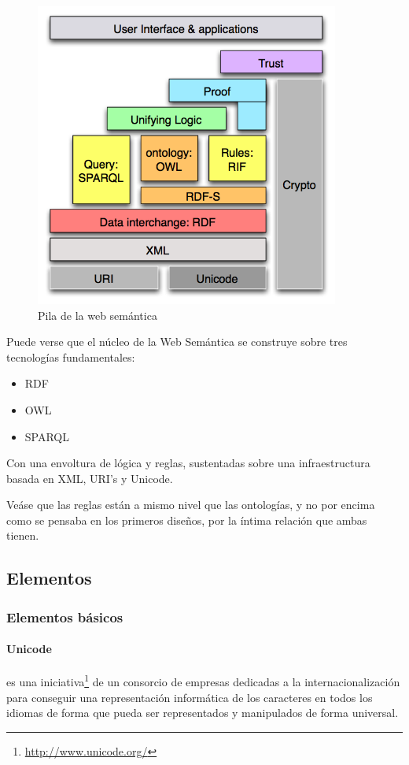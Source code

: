 \begin{figure}[H]
	\centering
	\includegraphics[width=10cm]{images/semantic-web-stack.png}
	\caption{Pila de la web semántica}
	\label{fig:swStack}
\end{figure}

Puede verse que el núcleo de la Web Semántica se construye sobre tres 
tecnologías fundamentales:

\begin{itemize}
  \item RDF\cite{Graham2004}
  \item OWL\cite{OWL}
  \item SPARQL\cite{Eric2006}
\end{itemize}

Con una envoltura de lógica y reglas, sustentadas sobre una infraestructura 
basada en XML, URI's y Unicode.

Veáse que las reglas están a mismo nivel que las ontologías, y no por
encima como se pensaba en los primeros diseños, por la íntima relación que ambas
tienen.

\subsection{Elementos}

\subsubsection{Elementos básicos}

\paragraph{Unicode}es una iniciativa\footnote{\url{http://www.unicode.org/}} de 
un consorcio de empresas dedicadas a la internacionalización para conseguir una 
representación informática de los caracteres en todos los idiomas de forma que 
pueda ser representados y manipulados de forma universal. 

